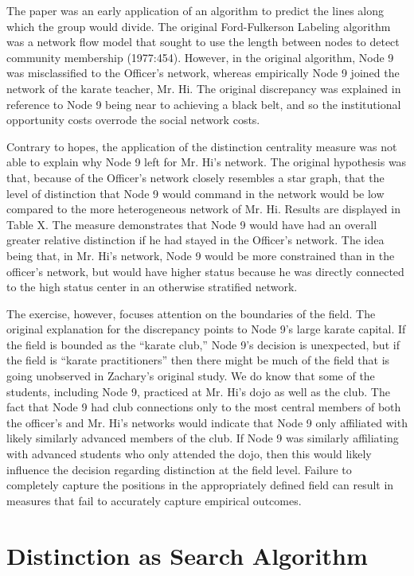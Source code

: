\documentclass[12pt]{article}
\begin{document}
The paper was an early application of an algorithm to predict the lines along which the group would divide. The original Ford-Fulkerson Labeling algorithm was a network flow model that sought to use the length between nodes to detect community membership (1977:454). However, in the original algorithm, Node 9 was misclassified to the Officer’s network, whereas empirically Node 9 joined the network of the karate teacher, Mr. Hi. The original discrepancy was explained in reference to Node 9 being near to achieving a black belt, and so the institutional opportunity costs overrode the social network costs. 

Contrary to hopes, the application of the distinction centrality measure was not able to explain why Node 9 left for Mr. Hi's network. The original hypothesis was that, because of the Officer's network closely resembles a star graph, that the level of distinction that Node 9 would command in the network would be low compared to the more heterogeneous network of Mr. Hi. Results are displayed in Table X. The measure demonstrates that Node 9 would have had an overall greater relative distinction if he had stayed in the Officer's network. The idea being that, in Mr. Hi's network, Node 9 would be more constrained than in the officer's network, but would have higher status because he was directly connected to the high status center in an otherwise stratified network. 

The exercise, however, focuses attention on the boundaries of the field. The original explanation for the discrepancy points to Node 9's large karate capital. If the field is bounded as the ``karate club,'' Node 9's decision is unexpected, but if the field is ``karate practitioners'' then there might be much of the field that is going unobserved in Zachary's original study. We do know that some of the students, including Node 9, practiced at Mr. Hi's dojo as well as the club. The fact that Node 9 had club connections only to the most central members of both the officer's and Mr. Hi's networks would indicate that Node 9 only affiliated with likely similarly advanced members of the club. If Node 9 was similarly affiliating with advanced students who only attended the dojo, then this would likely influence the decision regarding distinction at the field level. Failure to completely capture the positions in the appropriately defined field can result in measures that fail to accurately capture empirical outcomes. 

\section{Distinction as Search Algorithm}
\end{document}
